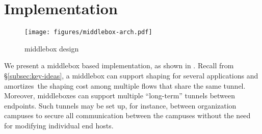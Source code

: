 \section{Implementation}
\label{sec:implementation}

\begin{figure}[t]
    \centering
    \texttt{[image: figures/middlebox-arch.pdf]}
    \caption{{\sys} middlebox design}
    \label{fig:minesvpn-impl}
\end{figure}

We present a middlebox based {\sys} implementation,
as shown in .
%
Recall from \S\ref{subsec:key-ideas}, a middlebox can support shaping for
several applications and amortizes~the shaping cost among multiple flows that
share the same tunnel.
Moreover, middleboxes can support multiple ``long-term'' tunnels between
endpoints. Such tunnels may be set up, for instance, between organization
campuses to secure all communication between the campuses without the need for
modifying individual end hosts.

